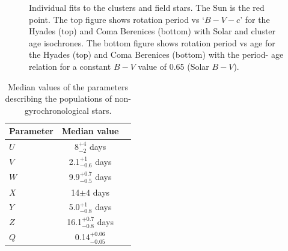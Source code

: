 \documentclass[useAMS, usenatbib]{mn2e}
\newcommand{\U}{8}  %
\newcommand{\V}{2.1}  %
\newcommand{\W}{9.9}  %
\newcommand{\X}{14} %
\newcommand{\Y}{5.0}  %
\newcommand{\Z}{16.1}  %
\newcommand{\Q}{0.14}
\newcommand{\Uerrp}{4}
\newcommand{\Uerrm}{2}
\newcommand{\Verrp}{1}
\newcommand{\Verrm}{0.6}
\newcommand{\Werrp}{0.7}
\newcommand{\Werrm}{0.5}
\newcommand{\Xerr}{4}
\newcommand{\Yerrp}{1}
\newcommand{\Yerrm}{0.8}
\newcommand{\Zerrp}{0.7}
\newcommand{\Zerrm}{0.8}
\newcommand{\Qerrp}{0.06}
\newcommand{\Qerrm}{0.05}
\begin{document}
\begin{figure}
\begin{center}
{        }
    \end{center}
    \caption{ Individual fits to the clusters and field stars. The Sun is the
	    red point. The top figure shows rotation period vs `$B-V-c$' for
	    the Hyades (top) and Coma Berenices (bottom) with Solar and cluster
	    age isochrones. The bottom figure shows rotation period vs age
	    for the Hyades (top) and Coma Berenices (bottom) with the period-
	    age relation for a constant $B-V$ value of 0.65 (Solar $B-V$).
\label{fig:subfigures1}}
\end{figure}

\begin{table}
\caption{Median values of the parameters describing the populations of
	non-gyrochronological stars. \label{tab:nuisance}}

\begin{center}
\begin{tabular}{lcc}
\hline\hline
{Parameter} & {Median value} \\
\hline
$U$ & \U$^{+\Uerrp}_{-\Uerrm}$ days \\
$V$ & \V$^{+\Verrp}_{-\Verrm}$ days \\
$W$ & \W$^{+\Werrp}_{-\Werrm}$ days \\
$X$ & \X$\pm\Xerr$ days \\
$Y$ & \Y$^{+\Yerrp}_{-\Yerrm}$ days \\
$Z$ & \Z$^{+\Zerrp}_{-\Zerrm}$ days \\
$Q$ & \Q$^{+\Qerrp}_{-\Qerrm}$ \\
\hline
\end{tabular}
\end{center}
\end{table}
\end{document}
